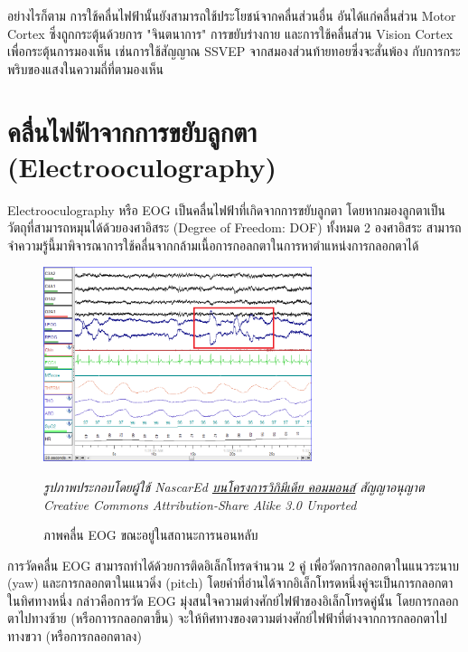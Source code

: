 อย่างไรก็ตาม การใช้คลื่นไฟฟ้านั้นยังสามารถใช้ประโยชน์จากคลื่นส่วนอื่น อันได้แก่คลื่นส่วน Motor Cortex ซึ่งถูกกระตุ้นด้วยการ "จินตนาการ"
การขยับร่างกาย และการใช้คลื่นส่วน Vision Cortex เพื่อกระตุ้นการมองเห็น เช่นการใช้สัญญาณ SSVEP จากสมองส่วนท้ายทอยซึ่งจะสั่นพ้อง
กับการกระพริบของแสงในความถี่ที่ตามองเห็น

\section{คลื่นไฟฟ้าจากการขยับลูกตา (Electrooculography)}
Electrooculography หรือ EOG เป็นคลื่นไฟฟ้าที่เกิดจากการขยับลูกตา โดยหากมองลูกตาเป็นวัตถุที่สามารถหมุนได้ด้วยองศาอิสระ (Degree of Freedom: DOF)
ทั้งหมด 2 องศาอิสระ สามารถจำความรู้นี้มาพิจารณาการใช้คลื่นจากกล้ามเนื้อการกอลกตาในการหาตำแหน่งการกลอกตาได้

\begin{figure}[h]
	\centering
	\includegraphics[width=0.7\textwidth]{images/rem_eog.png}
	\caption{ภาพคลื่น EOG ขณะอยู่ในสถานะการนอนหลับ}
	\hspace{\linewidth}
	\textit{รูปภาพประกอบโดยผู้ใช้ NascarEd \href{https://commons.wikimedia.org/wiki/file:sleep\_stage\_rem.png}{บนโครงการวิกิมีเดีย คอมมอนส์}
		สัญญาอนุญาต Creative Commons Attribution-Share Alike 3.0 Unported}
\end{figure}

การวัดคลื่น EOG สามารถทำได้ด้วยการติดอิเล็กโทรดจำนวน 2 คู่ เพื่อวัดการกลอกตาในแนวระนาบ (yaw) และการกลอกตาในแนวดิ่ง (pitch)
โดยค่าที่อ่านได้จากอิเล็กโทรดหนึ่งคู่จะเป็นการกลอกตาในทิศทางหนึ่ง กล่าวคือการวัด EOG มุ่งสนใจความต่างศักย์ไฟฟ้าของอิเล็กโทรดคู่นั้น
โดยการกลอกตาไปทางซ้าย (หรือกาารกลอกตาขึ้น) จะให้ทิศทางของตวามต่างศักย์ไฟฟ้าที่ต่างจากการกลอกตาไปทางขวา (หรือการกลอกตาลง)

